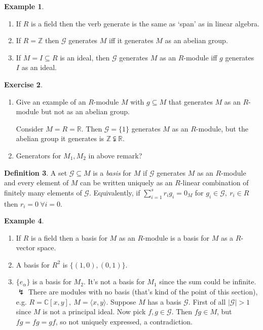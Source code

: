\documentclass[a4paper]{article}
\newcommand{\la}{\langle}
\newcommand{\ra}{\rangle}
\newcommand{\Z}{\mathbb Z}
\newcommand{\C}{\mathbb C}
\theoremstyle{definition}
\newtheorem{defn}{Definition}[subsection]
\newtheorem{example}[defn]{Example}
\newtheorem{exe}[defn]{Exercise}
\begin{document}
\begin{example}
\begin{enumerate}
\item If $R$ is a field then the verb generate is the same as `span' as in linear algebra.
\item If $R=\Z$ then $\mathcal G$ generates $M$ iff it generates $M$ as an abelian group.
\item If $M=I\subseteq R$ is an ideal, then $\mathcal G$ generates $M$ as an $R$-module iff $g$ generates $I$ as an ideal.
\end{enumerate}
\end{example}

\begin{exe}
\begin{enumerate}
\item Give an example of an $R$-module $M$ with $g\subseteq M$ that generates $M$ as an $R$-module but not as an abelian group.

Consider $M=R=\mathbb R$. Then $\mathcal G=\{1\}$ generates $M$ as an $R$-module, but the abelian group it generates is $\Z\subsetneqq \mathbb R$.
\item Generators for $M_1,M_2$ in above remark?
\end{enumerate}
\end{exe}

\begin{defn}
A set $\mathcal G\subseteq M$ is a \textit{basis} for $M$ if $\mathcal G$ generates $M$ as an $R$-module and every element of $M$ can be written uniquely as an $R$-linear combination of finitely many elements of $\mathcal G$. Equivalently, if $\sum_{i=1}^s r_i g_i=0_M$ for $g_i\in \mathcal G,\ r_i\in R$ then $r_i=0 \ \forall i=0$.
\end{defn}

\begin{example}
\begin{enumerate}
\item If $R$ is a field then a basis for $M$ as an $R$-module is a basis for $M$ as a $R$-vector space.
\item A basis for $R^2$ is $\{(1,0),(0,1)\}$.
\item $\{e_\alpha\}$ is a basis for $M_2$. It's not a basis for $M_1$ since the sum could be infinite. $\lightning$ There are modules with no basis (that's kind of the point of this section), e.g. $R=\C[x,y],\ M=\la x,y\ra$. Suppose $M$ has a basis $\mathcal G$. First of all $|\mathcal G|>1$ since $M$ is not a principal ideal. Now pick $f,g\in \mathcal G$. Then $fg\in M$, but $fg=fg=gf$, so not uniquely expressed, a contradiction.
\end{enumerate}
\end{example}
\end{document}
